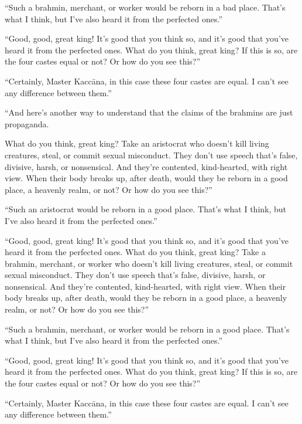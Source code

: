 \documentclass[12pt,openany]{book}%
\begin{document}
“Such a brahmin, merchant, or worker would be reborn in a bad place. That’s what I think, but I’ve also heard it from the perfected ones.” 

“Good, good, great king! It’s good that you think so, and it’s good that you’ve heard it from the perfected ones. What do you think, great king? If this is so, are the four castes equal or not? Or how do you see this?” 

“Certainly, Master \textsanskrit{Kaccāna}, in this case these four castes are equal. I can’t see any difference between them.” 

“And here’s another way to understand that the claims of the brahmins are just propaganda. 

What do you think, great king? Take an aristocrat who doesn’t kill living creatures, steal, or commit sexual misconduct. They don’t use speech that’s false, divisive, harsh, or nonsensical. And they’re contented, kind-hearted, with right view. When their body breaks up, after death, would they be reborn in a good place, a heavenly realm, or not? Or how do you see this?” 

“Such an aristocrat would be reborn in a good place. That’s what I think, but I’ve also heard it from the perfected ones.” 

“Good, good, great king! It’s good that you think so, and it’s good that you’ve heard it from the perfected ones. What do you think, great king? Take a brahmin, merchant, or worker who doesn’t kill living creatures, steal, or commit sexual misconduct. They don’t use speech that’s false, divisive, harsh, or nonsensical. And they’re contented, kind-hearted, with right view. When their body breaks up, after death, would they be reborn in a good place, a heavenly realm, or not? Or how do you see this?” 

“Such a brahmin, merchant, or worker would be reborn in a good place. That’s what I think, but I’ve also heard it from the perfected ones.” 

“Good, good, great king! It’s good that you think so, and it’s good that you’ve heard it from the perfected ones. What do you think, great king? If this is so, are the four castes equal or not? Or how do you see this?” 

“Certainly, Master \textsanskrit{Kaccāna}, in this case these four castes are equal. I can’t see any difference between them.” 
\end{document}

